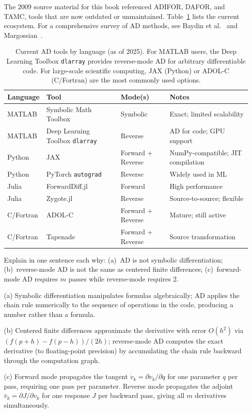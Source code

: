 The 2009 source material for this book referenced ADIFOR, DAFOR,
and TAMC, tools that are now outdated or unmaintained.
Table~\ref{tab:ADtools} lists the current ecosystem.
For a comprehensive survey of AD methods, see Baydin et al.~\cite{baydin2018automatic}
and Margossian~\cite{margossian2019review}.

\begin{table}[htb]
\centering
\renewcommand{\arraystretch}{1.2}
\begin{tabular}{p{2cm}p{4.2cm}p{2.5cm}p{3.5cm}}
\toprule
Language & Tool & Mode(s) & Notes \\
\midrule
MATLAB & Symbolic Math Toolbox & Symbolic & Exact; limited scalability \\
MATLAB & Deep Learning Toolbox \texttt{dlarray} & Reverse & AD for code; GPU support \\
Python & JAX & Forward + Reverse & NumPy-compatible; JIT compilation \\
Python & PyTorch \texttt{autograd} & Reverse & Widely used in ML \\
Julia & ForwardDiff.jl & Forward & High performance \\
Julia & Zygote.jl & Reverse & Source-to-source; flexible \\
C/Fortran & ADOL-C & Forward + Reverse & Mature; still active \\
C/Fortran & Tapenade & Forward + Reverse & Source transformation \\
\bottomrule
\end{tabular}
\caption{Current AD tools by language (as of 2025).
         For MATLAB users, the Deep Learning Toolbox \texttt{dlarray}
         provides reverse-mode AD for arbitrary differentiable code.
         For large-scale scientific computing, JAX (Python) or ADOL-C
         (C/Fortran) are the most commonly used options.}
\label{tab:ADtools}
\end{table}

\begin{selfcheck}
Explain in one sentence each why: (a)~AD is not symbolic differentiation;
(b)~reverse-mode AD is not the same as centered finite differences;
(c)~forward-mode AD requires $m$ passes while reverse-mode requires 2.
\end{selfcheck}
\begin{scAnswer}
(a) Symbolic differentiation manipulates formulas algebraically;
AD applies the chain rule numerically to the sequence of operations
in the code, producing a number rather than a formula.

(b) Centered finite differences approximate the derivative with error
$O(h^2)$ via $(f(p+h)-f(p-h))/(2h)$; reverse-mode AD computes the
exact derivative (to floating-point precision) by accumulating the
chain rule backward through the computation graph.

(c) Forward mode propagates the tangent $\dot{v}_k = \partial v_k/\partial q$
for one parameter $q$ per pass, requiring one pass per parameter.
Reverse mode propagates the adjoint $\bar{v}_k = \partial J/\partial v_k$
for one response $J$ per backward pass, giving all $m$ derivatives simultaneously.
\end{scAnswer}

